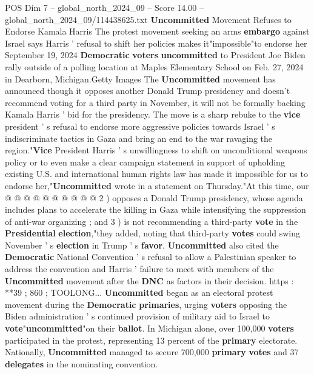 \begin{textsample}{POS Dim 7 – global\_north\_2024\_09 – Score 14.00 – global\_north\_2024\_09/114438625.txt}  \label{ex:f7_pos_073}
\textbf{Uncommitted} Movement Refuses to Endorse Kamala Harris The protest movement seeking an arms \textbf{embargo} against Israel says Harris ' refusal to shift her policies makes it"impossible"to endorse her September 19, 2024 \textbf{Democratic} \textbf{voters} \textbf{uncommitted} to President Joe Biden rally outside of a polling location at Maples Elementary School on Feb. 27, 2024 in Dearborn, Michigan.Getty Images The \textbf{Uncommitted} movement has announced though it opposes another Donald Trump presidency and doesn't recommend voting for a third party in November, it will not be formally backing Kamala Harris ' bid for the presidency.
The move is a sharp rebuke to the \textbf{vice} president ' s refusal to endorse more aggressive policies towards Israel ' s indiscriminate tactics in Gaza and bring an end to the war ravaging the region."\textbf{Vice} President Harris ' s unwillingness to shift on unconditional weapons policy or to even make a clear campaign statement in support of upholding existing U.S. and international human rights law has made it impossible for us to endorse her,"\textbf{Uncommitted} wrote in a statement on Thursday."At this time, our @ @ @ @ @ @ @ @ @ @ 2 ) opposes a Donald Trump presidency, whose agenda includes plans to accelerate the killing in Gaza while intensifying the suppression of anti-war organizing ; and 3 ) is not recommending a third-party \textbf{vote} in the \textbf{Presidential} \textbf{election},"they added, noting that third-party \textbf{votes} could swing November ' s \textbf{election} in Trump ' s \textbf{favor}. \textbf{Uncommitted} also cited the \textbf{Democratic} National Convention ' s refusal to allow a Palestinian speaker to address the convention and Harris ' failure to meet with members of the \textbf{Uncommitted} movement after the \textbf{DNC} as factors in their decision. https : **39 ; 860 ; TOOLONG... \textbf{Uncommitted} began as an electoral protest movement during the \textbf{Democratic} \textbf{primaries}, urging \textbf{voters} opposing the Biden administration ' s continued provision of military aid to Israel to \textbf{vote}"\textbf{uncommitted}"on their \textbf{ballot}.
In Michigan alone, over 100,000 \textbf{voters} participated in the protest, representing 13 percent of the \textbf{primary} electorate.
Nationally, \textbf{Uncommitted} managed to secure 700,000 \textbf{primary} \textbf{votes} and 37 \textbf{delegates} in the nominating convention.

\end{textsample}
